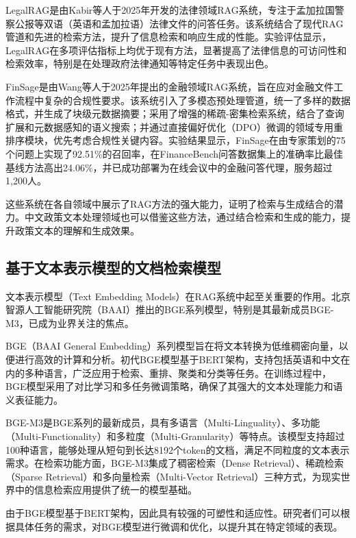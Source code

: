 \documentclass[12pt, a4paper]{ctexart}
\begin{document}
LegalRAG是由Kabir等人于2025年开发的法律领域RAG系统，专注于孟加拉国警察公报等双语（英语和孟加拉语）法律文件的问答任务\cite{kabir2025legalraghybridragmultilingual}。该系统结合了现代RAG管道和先进的检索方法，提升了信息检索和响应生成的性能。实验评估显示，LegalRAG在多项评估指标上均优于现有方法，显著提高了法律信息的可访问性和检索效率，特别是在处理政府法律通知等特定任务中表现出色。 

FinSage是由Wang等人于2025年提出的金融领域RAG系统，旨在应对金融文件工作流程中复杂的合规性要求\cite{wang2025finsagemultiaspectragfinancial}。该系统引入了多模态预处理管道，统一了多样的数据格式，并生成了块级元数据摘要；采用了增强的稀疏-密集检索系统，结合了查询扩展和元数据感知的语义搜索；并通过直接偏好优化（DPO）微调的领域专用重排序模块，优先考虑合规性关键内容。实验结果显示，FinSage在由专家策划的75个问题上实现了92.51\%的召回率，在FinanceBench问答数据集上的准确率比最佳基线方法高出24.06\%，并已成功部署为在线会议中的金融问答代理，服务超过1,200人。

这些系统在各自领域中展示了RAG方法的强大能力，证明了检索与生成结合的潜力。中文政策文本处理领域也可以借鉴这些方法，通过结合检索和生成的能力，提升政策文本的理解和生成效果。

\subsection{基于文本表示模型的文档检索模型}

文本表示模型（Text Embedding Models）在RAG系统中起至关重要的作用。北京智源人工智能研究院（BAAI）推出的BGE系列模型，特别是其最新成员BGE-M3，已成为业界关注的焦点。

BGE（BAAI General Embedding）系列模型旨在将文本转换为低维稠密向量，以便进行高效的计算和分析\cite{bge_embedding}。初代BGE模型基于BERT架构，支持包括英语和中文在内的多种语言，广泛应用于检索、重排、聚类和分类等任务。在训练过程中，BGE模型采用了对比学习和多任务微调策略，确保了其强大的文本处理能力和语义表征能力。

BGE-M3是BGE系列的最新成员，具有多语言（Multi-Linguality）、多功能（Multi-Functionality）和多粒度（Multi-Granularity）等特点\cite{chen2024bgem3embeddingmultilingualmultifunctionality}。该模型支持超过100种语言，能够处理从短句到长达8192个token的文档，满足不同粒度的文本表示需求。在检索功能方面，BGE-M3集成了稠密检索（Dense Retrieval）、稀疏检索（Sparse Retrieval）和多向量检索（Multi-Vector Retrieval）三种方式，为现实世界中的信息检索应用提供了统一的模型基础。

由于BGE模型基于BERT架构，因此具有较强的可塑性和适应性。研究者们可以根据具体任务的需求，对BGE模型进行微调和优化，以提升其在特定领域的表现。
\end{document}
